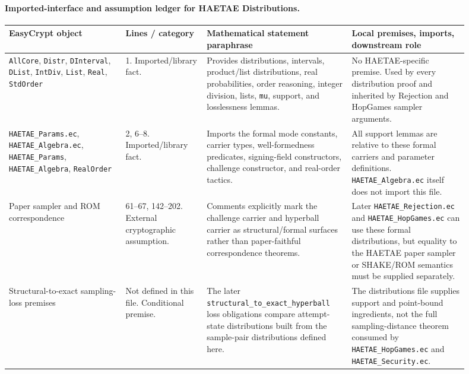 \documentclass[11pt]{report}
\DeclareRobustCommand{\file}[1]{\ifmmode\text{\nolinkurl{#1}}\else\nolinkurl{#1}\fi}
\DeclareRobustCommand{\ec}[1]{\ifmmode\text{\nolinkurl{#1}}\else\nolinkurl{#1}\fi}
\theoremstyle{definition}
\theoremstyle{plain}
\begin{document}
\paragraph{Imported-interface and assumption ledger for HAETAE Distributions.}
{\footnotesize
\begin{longtable}{p{0.23\linewidth}p{0.16\linewidth}p{0.28\linewidth}p{0.23\linewidth}}
\toprule
\textbf{EasyCrypt object} & \textbf{Lines / category} &
\textbf{Mathematical statement paraphrase} &
\textbf{Local premises, imports, downstream role} \\
\midrule
\ec{AllCore}, \ec{Distr}, \ec{DInterval}, \ec{DList}, \ec{IntDiv},
\ec{List}, \ec{Real}, \ec{StdOrder} &
1. Imported/library fact. &
Provides distributions, intervals, product/list distributions, real
probabilities, order reasoning, integer division, lists, \ec{mu}, support, and
losslessness lemmas. &
No HAETAE-specific premise.  Used by every distribution proof and inherited by
Rejection and HopGames sampler arguments. \\
\midrule
\file{HAETAE\_Params.ec}, \file{HAETAE\_Algebra.ec},
\ec{HAETAE\_Params}, \ec{HAETAE\_Algebra}, \ec{RealOrder} &
2, 6--8. Imported/library fact. &
Imports the formal mode constants, carrier types, well-formedness predicates,
signing-field constructors, challenge constructor, and real-order tactics. &
All support lemmas are relative to these formal carriers and parameter
definitions.  \file{HAETAE\_Algebra.ec} itself does not import this file. \\
\midrule
Paper sampler and ROM correspondence &
61--67, 142--202. External cryptographic assumption. &
Comments explicitly mark the challenge carrier and hyperball carrier as
structural/formal surfaces rather than paper-faithful correspondence theorems. &
Later \file{HAETAE\_Rejection.ec} and \file{HAETAE\_HopGames.ec} can use these
formal distributions, but equality to the HAETAE paper sampler or SHAKE/ROM
semantics must be supplied separately. \\
\midrule
Structural-to-exact sampling-loss premises &
Not defined in this file. Conditional premise. &
The later \ec{structural\_to\_exact\_hyperball} loss obligations compare
attempt-state distributions built from the sample-pair distributions defined
here. &
The distributions file supplies support and point-bound ingredients, not the
full sampling-distance theorem consumed by \file{HAETAE\_HopGames.ec} and
\file{HAETAE\_Security.ec}. \\
\bottomrule
\end{longtable}
}
\end{document}
